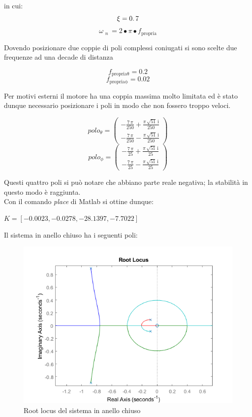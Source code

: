 \begin{center}
	in cui:
	$$
	\xi =0\ldotp 7
	$$
	$$
	\omega {\;}_{n\;} =2\bullet \pi \bullet f_{\mathrm{propria}}
	$$
\end{center}Dovendo posizionare due coppie di poli complessi coniugati si sono scelte due frequenze ad una decade di distanza
\begin{center}
	
	$$
	f_{\mathrm{propria\theta}} =  0.2
	$$
	$$
	f_{\mathrm{propria\phi}} =  0.02
	$$
\end{center}Per motivi esterni il motore ha una coppia massima molto limitata ed è stato dunque necessario posizionare i poli in modo che non fossero troppo veloci.
\begin{center}
	
	$$
	polo_{\theta} = \left(\begin{array}{c}
	-\frac{7\,\pi }{250}+\frac{\pi \,\sqrt{51}\,\mathrm{i}}{250}\\
	-\frac{7\,\pi }{250}-\frac{\pi \,\sqrt{51}\,\mathrm{i}}{250}
	\end{array}\right)
	$$
	$$
	polo_{\phi} = \left(\begin{array}{c}
	-\frac{7\,\pi }{25}+\frac{\pi \,\sqrt{51}\,\mathrm{i}}{25}\\
	-\frac{7\,\pi }{25}-\frac{\pi \,\sqrt{51}\,\mathrm{i}}{25}
	\end{array}\right)
	$$
\end{center}	Questi quattro poli si può notare che abbiano parte reale negativa; la stabilità in questo modo è raggiunta.\\
Con il comando \textit{place} di Matlab si ottine dunque:
\begin{center}

	$	K =[  -0.0023  , -0.0278, -28.1397  , -7.7022]$

\end{center}
Il sistema in anello chiuso ha i seguenti poli:
\begin{figure}[H]
	\centering   	
	\includegraphics[width=1\textwidth]{Immagini/root_locus_closed_loop.png}
	\caption{Root locus del sistema in anello chiuso}
	\label{fig:closed_loop_root}
\end{figure}
